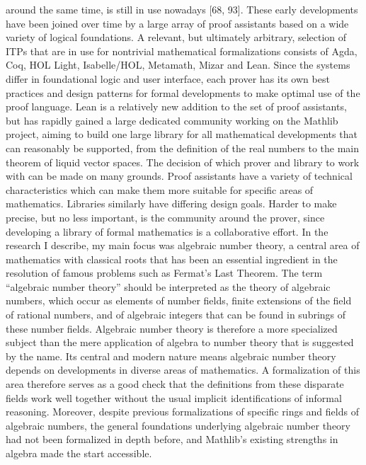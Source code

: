 \documentclass{book}
\theoremstyle{definition}
\begin{document}
around the same time, is still in use nowadays [68, 93]. These early developments have been joined over time by a large array of proof assistants based on a wide variety of logical foundations. A relevant, but ultimately arbitrary, selection of ITPs that are in use for nontrivial mathematical formalizations consists of Agda, Coq, HOL Light, Isabelle/HOL, Metamath, Mizar and Lean. Since the systems differ in foundational logic and user interface, each prover has its own best practices and design patterns for formal developments to make optimal use of the proof language.
Lean is a relatively new addition to the set of proof assistants, but has rapidly gained a large dedicated community working on the Mathlib project, aiming to build one large library for all mathematical developments that can reasonably be supported, from the definition of the real numbers to the main theorem of liquid vector spaces. The decision of which prover and library to work with can be made on many grounds. Proof assistants have a variety of technical characteristics which can make them more suitable for specific areas of mathematics. Libraries similarly have differing design goals. Harder to make precise, but no less important, is the community around the prover, since developing a library of formal mathematics is a collaborative effort.
In the research I describe, my main focus was algebraic number theory, a central area of mathematics with classical roots that has been an essential ingredient in the resolution of famous problems such as Fermat's Last Theorem. The term “algebraic number theory” should be interpreted as the theory of algebraic numbers, which occur as elements of number fields, finite extensions of the field of rational numbers, and of algebraic integers that can be found in subrings of these number fields. Algebraic number theory is therefore a more specialized subject than the mere application of algebra to number theory that is suggested by the name. Its central and modern nature means algebraic number theory depends on developments in diverse areas of mathematics. A formalization of this area therefore serves as a good check that the definitions from these disparate fields work well together without the usual implicit identifications of informal reasoning. Moreover, despite previous formalizations of specific rings and fields of algebraic numbers, the general foundations underlying algebraic number theory had not been formalized in depth before, and Mathlib's existing strengths in algebra made the start accessible.
\end{document}
